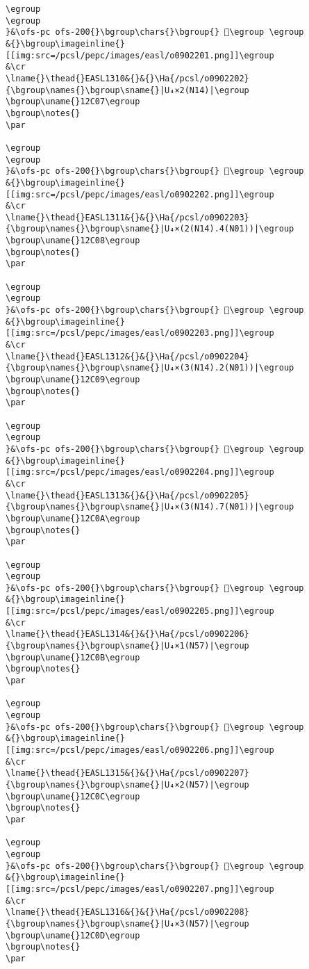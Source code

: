 \begin{verbatim}
\egroup
\egroup
}&\ofs-pc ofs-200{}\bgroup\chars{}\bgroup{} 𒰆\egroup \egroup
&{}\bgroup\imageinline{}[[img:src=/pcsl/pepc/images/easl/o0902201.png]]\egroup
&\cr
\lname{}\thead{}EASL1310&{}&{}\Ha{/pcsl/o0902202}{\bgroup\names{}\bgroup\sname{}|U₄×2(N14)|\egroup
\bgroup\uname{}12C07\egroup
\bgroup\notes{}
\par 

\egroup
\egroup
}&\ofs-pc ofs-200{}\bgroup\chars{}\bgroup{} 𒰇\egroup \egroup
&{}\bgroup\imageinline{}[[img:src=/pcsl/pepc/images/easl/o0902202.png]]\egroup
&\cr
\lname{}\thead{}EASL1311&{}&{}\Ha{/pcsl/o0902203}{\bgroup\names{}\bgroup\sname{}|U₄×(2(N14).4(N01))|\egroup
\bgroup\uname{}12C08\egroup
\bgroup\notes{}
\par 

\egroup
\egroup
}&\ofs-pc ofs-200{}\bgroup\chars{}\bgroup{} 𒰈\egroup \egroup
&{}\bgroup\imageinline{}[[img:src=/pcsl/pepc/images/easl/o0902203.png]]\egroup
&\cr
\lname{}\thead{}EASL1312&{}&{}\Ha{/pcsl/o0902204}{\bgroup\names{}\bgroup\sname{}|U₄×(3(N14).2(N01))|\egroup
\bgroup\uname{}12C09\egroup
\bgroup\notes{}
\par 

\egroup
\egroup
}&\ofs-pc ofs-200{}\bgroup\chars{}\bgroup{} 𒰉\egroup \egroup
&{}\bgroup\imageinline{}[[img:src=/pcsl/pepc/images/easl/o0902204.png]]\egroup
&\cr
\lname{}\thead{}EASL1313&{}&{}\Ha{/pcsl/o0902205}{\bgroup\names{}\bgroup\sname{}|U₄×(3(N14).7(N01))|\egroup
\bgroup\uname{}12C0A\egroup
\bgroup\notes{}
\par 

\egroup
\egroup
}&\ofs-pc ofs-200{}\bgroup\chars{}\bgroup{} 𒰊\egroup \egroup
&{}\bgroup\imageinline{}[[img:src=/pcsl/pepc/images/easl/o0902205.png]]\egroup
&\cr
\lname{}\thead{}EASL1314&{}&{}\Ha{/pcsl/o0902206}{\bgroup\names{}\bgroup\sname{}|U₄×1(N57)|\egroup
\bgroup\uname{}12C0B\egroup
\bgroup\notes{}
\par 

\egroup
\egroup
}&\ofs-pc ofs-200{}\bgroup\chars{}\bgroup{} 𒰋\egroup \egroup
&{}\bgroup\imageinline{}[[img:src=/pcsl/pepc/images/easl/o0902206.png]]\egroup
&\cr
\lname{}\thead{}EASL1315&{}&{}\Ha{/pcsl/o0902207}{\bgroup\names{}\bgroup\sname{}|U₄×2(N57)|\egroup
\bgroup\uname{}12C0C\egroup
\bgroup\notes{}
\par 

\egroup
\egroup
}&\ofs-pc ofs-200{}\bgroup\chars{}\bgroup{} 𒰌\egroup \egroup
&{}\bgroup\imageinline{}[[img:src=/pcsl/pepc/images/easl/o0902207.png]]\egroup
&\cr
\lname{}\thead{}EASL1316&{}&{}\Ha{/pcsl/o0902208}{\bgroup\names{}\bgroup\sname{}|U₄×3(N57)|\egroup
\bgroup\uname{}12C0D\egroup
\bgroup\notes{}
\par 


\end{verbatim}
